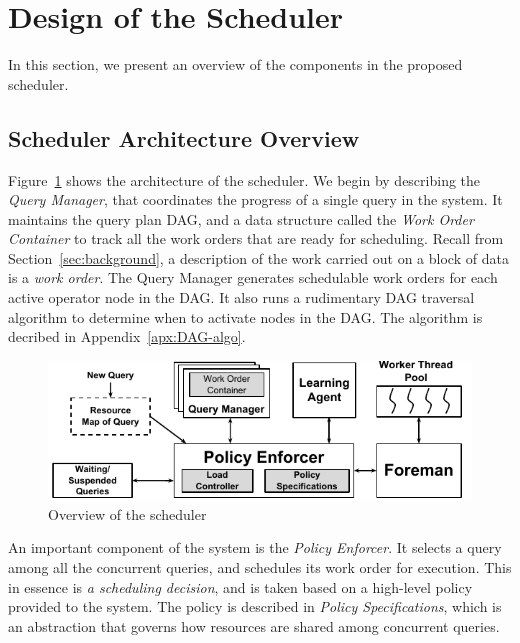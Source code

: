 \section{Design of the Scheduler}\label{sec:design}
In this section, we present an overview of the components in the proposed \sys{} scheduler.

\subsection{Scheduler Architecture Overview}\label{ssec:scheduler-arch}
Figure~\ref{fig:scheduler-architecture} shows the architecture of the \sys{} scheduler.
We begin by describing the \textit{Query Manager}, that coordinates the progress of a single query in the system.
It maintains the query plan DAG, and a data structure called
the \textit{Work Order Container} to track all the work orders that are ready for
scheduling. 
Recall from Section~\ref{sec:background}, a description of the work carried out on a block of data is a \textit{work order}. 
The Query Manager generates schedulable work orders for each active operator node in the DAG. 
It also runs a rudimentary DAG traversal algorithm to determine when to activate nodes in the DAG. 
The algorithm is decribed in Appendix~\ref{apx:DAG-algo}.

\begin{figure}
	\centering
	\includegraphics[width=\textwidth]{policy/figures/Scheduler-Architecture.pdf}
	\vspace*{-1.5em}
	\caption{Overview of the scheduler}
	\label{fig:scheduler-architecture}
	\vspace*{-1.5em}
\end{figure}

An important component of the system is the \textit{Policy Enforcer}.
It selects a query among all the concurrent queries, and schedules its work order for execution. 
This in essence is \textit{a scheduling decision}, and is taken based on a high-level policy provided to the system.
The policy is described in \textit{Policy Specifications}, which is an
abstraction that governs how resources are shared among concurrent queries. 

